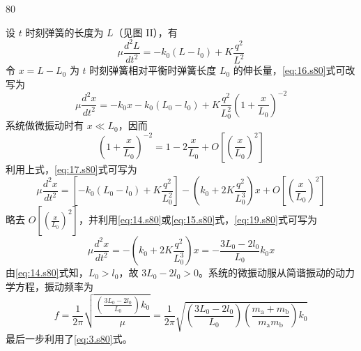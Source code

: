 \begin{solution}{80}
\begin{subsolution}
\begin{subsubsolution}
            设 $t$ 时刻弹簧的长度为 $L$（见图 II），有
            \begin{equation}
                \mu \frac{d^{2} L}{d t^{2}} = - k_{0} (L - l_{0}) + K \frac{q^{2}}{L^{2}}
                \label{eq:16.s80}
            \end{equation}
            令 $x = L - L_{0}$ 为 $t$ 时刻弹簧相对平衡时弹簧长度 $L_{0}$ 的伸长量，\eqref{eq:16.s80}式可改写为
            \begin{equation}
                \mu \frac{d^{2} x}{d t^{2}} = - k_{0} x - k_{0} (L_{0} - l_{0}) + K \frac{q^{2}}{L_{0}^{2}} \left(1 + \frac{x}{L_{0}}\right)^{-2}
                \label{eq:17.s80}
            \end{equation}
            系统做微振动时有 $x \ll L_{0}$，因而
            \begin{equation}
                \left(1 + \frac{x}{L_{0}}\right)^{-2} = 1 - 2 \frac{x}{L_{0}} + O\left[\left(\frac{x}{L_{0}}\right)^{2}\right]
                \label{eq:18.s80}
            \end{equation}
            利用上式，\eqref{eq:17.s80}式可写为
            \begin{equation}
                \mu \frac{d^{2} x}{d t^{2}} = \left[ - k_{0} (L_{0} - l_{0}) + K \frac{q^{2}}{L_{0}^{2}} \right] - \left( k_{0} + 2 K \frac{q^{2}}{L_{0}^{3}} \right) x + O\left[\left(\frac{x}{L_{0}}\right)^{2}\right]
                \label{eq:19.s80}
            \end{equation}
            略去 $O\left[\left(\frac{x}{L_{0}}\right)^{2}\right]$，并利用\eqref{eq:14.s80}或\eqref{eq:15.s80}式，\eqref{eq:19.s80}式可写为
            \begin{equation}
                \mu \frac{d^{2} x}{d t^{2}} = - \left( k_{0} + 2 K \frac{q^{2}}{L_{0}^{3}} \right) x = - \frac{3 L_{0} - 2 l_{0}}{L_{0}} k_{0} x
                \label{eq:20.s80}
            \end{equation}
            由\eqref{eq:14.s80}式知，$L_{0}>l_{0}$，故 $3L_{0}-2l_{0}>0$。系统的微振动服从简谐振动的动力学方程，振动频率为
            \begin{equation}
                f = \frac{1}{2\pi} \sqrt{\frac{\left(\frac{3 L_{0} - 2 l_{0}}{L_{0}}\right) k_{0}}{\mu}} = \frac{1}{2\pi} \sqrt{\left(\frac{3 L_{0} - 2 l_{0}}{L_{0}}\right) \left(\frac{m_{\mathrm{a}} + m_{\mathrm{b}}}{m_{\mathrm{a}} m_{\mathrm{b}}}\right) k_{0}}
                \label{eq:21.s80}
            \end{equation}
            最后一步利用了\eqref{eq:3.s80}式。
        \end{subsubsolution}
    \end{subsolution}
\end{solution}